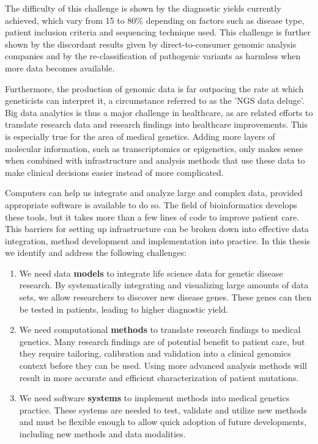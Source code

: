 The difficulty of this challenge is shown by the diagnostic yields currently achieved, which vary from 15 to 80\%\cite{Wang_2014, Mart_nez_2016, Daoud_2016, Yubero_2016} depending on factors such as disease type, patient inclusion criteria and sequencing technique used.
This challenge is further shown by the discordant results given by direct-to-consumer genomic analysis companies\cite{Corpas_2015} and by the re-classification of pathogenic variants as harmless when more data becomes available\cite{Cassa_2013}.

Furthermore, the production of genomic data is far outpacing the rate at which geneticists can interpret it, a circumstance referred to as the 'NGS data deluge'\cite{Schrijver_2012}.
Big data analytics is thus a major challenge in healthcare\cite{Raghupathi_2014,Belle_2015}, as are related efforts to translate research data and research findings into healthcare improvements\cite{Alyass_2015,Auffray_2016}.
This is especially true for the area of medical genetics\cite{Ginsburg_2014,Wang_2014b,Bowdin_2014}.
Adding more layers of molecular information, such as transcriptomics or epigenetics, only makes sense when combined with infrastructure and analysis methods that use these data to make clinical decisions easier instead of more complicated.

Computers can help us integrate and analyze large and complex data, provided appropriate software is available to do so.
The field of bioinformatics develops these tools, but it takes more than a few lines of code to improve patient care.
This barriers for setting up infrastructure can be broken down into effective data integration, method development and implementation into practice.
In this thesis we identify and address the following challenges:

\begin{enumerate}
  \item We need data \textbf{models} to integrate life science data for genetic disease research. By systematically integrating and visualizing large a\-mounts of data sets, we allow researchers to discover new disease genes. These genes can then be tested in patients, leading to higher diagnostic yield.
  \item We need computational \textbf{methods} to translate research findings to medical genetics. Many research findings are of potential benefit to patient care, but they require tailoring, calibration and validation into a clinical genomics context before they can be used. Using more advanced analysis methods will result in more accurate and efficient characterization of patient mutations.
  \item We need software \textbf{systems} to implement methods into medical genetics practice. These systems are needed to test, validate and utilize new methods and must be flexible enough to allow quick adoption of future developments, including new methods and data modalities.
\end{enumerate}

